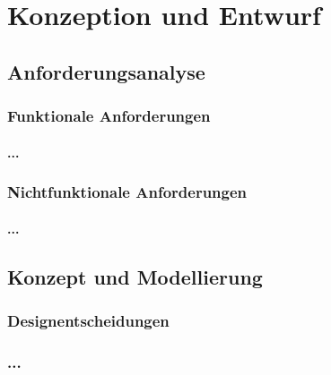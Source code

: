 \chapter{Konzeption und Entwurf}
\label{konzeption_und_entwurf}


\section{Anforderungsanalyse}
\label{anforderungsanalyse}


\subsection{Funktionale Anforderungen}
\label{anforderungsanalyse_funktional}

\subsubsection{...}

\subsection{Nichtfunktionale Anforderungen}
\label{anforderungsanalyse_nichtfunktional}

\subsubsection{...}

\section{Konzept und Modellierung}
\label{konzept_und_modellierung}


\subsection{Designentscheidungen}
\label{konzept_und_modellierung_designentscheidungen}

\subsection{...}